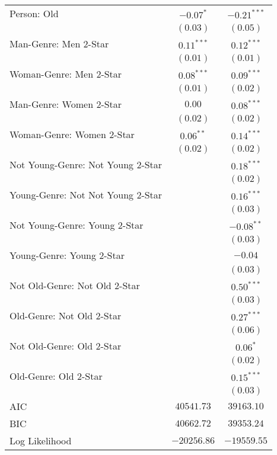 \begin{center}
\begin{longtable}{l c c}
Person: Old                       & $-0.07^{*}$   & $-0.21^{***}$ \\
                                  & $(0.03)$      & $(0.05)$      \\
Man-Genre: Men 2-Star             & $0.11^{***}$  & $0.12^{***}$  \\
                                  & $(0.01)$      & $(0.01)$      \\
Woman-Genre: Men 2-Star           & $0.08^{***}$  & $0.09^{***}$  \\
                                  & $(0.01)$      & $(0.02)$      \\
Man-Genre: Women 2-Star           & $0.00$        & $0.08^{***}$  \\
                                  & $(0.02)$      & $(0.02)$      \\
Woman-Genre: Women 2-Star         & $0.06^{**}$   & $0.14^{***}$  \\
                                  & $(0.02)$      & $(0.02)$      \\
Not Young-Genre: Not Young 2-Star &               & $0.18^{***}$  \\
                                  &               & $(0.02)$      \\
Young-Genre: Not Not Young 2-Star &               & $0.16^{***}$  \\
                                  &               & $(0.03)$      \\
Not Young-Genre: Young 2-Star     &               & $-0.08^{**}$  \\
                                  &               & $(0.03)$      \\
Young-Genre: Young 2-Star         &               & $-0.04$       \\
                                  &               & $(0.03)$      \\
Not Old-Genre: Not Old 2-Star     &               & $0.50^{***}$  \\
                                  &               & $(0.03)$      \\
Old-Genre: Not Old 2-Star         &               & $0.27^{***}$  \\
                                  &               & $(0.06)$      \\
Not Old-Genre: Old 2-Star         &               & $0.06^{*}$    \\
                                  &               & $(0.02)$      \\
Old-Genre: Old 2-Star             &               & $0.15^{***}$  \\
                                  &               & $(0.03)$      \\
\midrule
AIC                               & $40541.73$    & $39163.10$    \\
BIC                               & $40662.72$    & $39353.24$    \\
Log Likelihood                    & $-20256.86$   & $-19559.55$   \\
\end{longtable}
\end{center}
